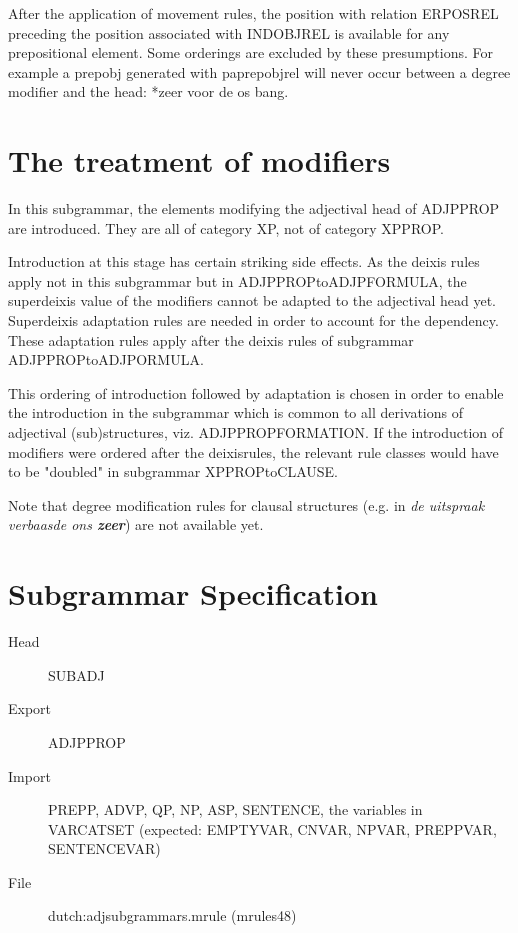 After the application of movement rules, the position with relation ERPOSREL 
preceding the position associated with INDOBJREL is 
available for any prepositional element.
Some orderings are excluded by these presumptions. For example a prepobj
generated with  paprepobjrel will never occur between a degree modifier and the 
head: *zeer voor de os bang. 
\section{The treatment of modifiers}
In this subgrammar, the elements modifying the adjectival head
of ADJPPROP are introduced. They are all of category XP, not of category XPPROP. 

Introduction at this stage has certain striking side effects. 
As the deixis rules apply not in this subgrammar but in 
ADJPPROPtoADJPFORMULA, the superdeixis value of 
the modifiers cannot be adapted to the adjectival 
head yet. Superdeixis adaptation rules are needed 
in order to account for the dependency. 
These adaptation rules apply after the deixis rules 
of subgrammar ADJPPROPtoADJPORMULA.

This ordering of introduction followed by adaptation is chosen 
in order to enable the introduction in the subgrammar which 
is common to 
all derivations of adjectival (sub)structures, viz. ADJPPROPFORMATION.
If the introduction of modifiers were ordered after the deixisrules,
the relevant rule classes would have to be "doubled" in subgrammar
XPPROPtoCLAUSE.

Note that degree modification rules for clausal structures (e.g. in {\em de 
uitspraak verbaasde ons {\bf zeer}}) are not available yet.

\section{Subgrammar Specification}

\begin{description}
  \item[Head] SUBADJ
  \item[Export] ADJPPROP
  \item[Import] PREPP, 
ADVP,  QP, NP, ASP, SENTENCE, the variables in VARCATSET
(expected: EMPTYVAR, CNVAR, NPVAR, PREPPVAR, SENTENCEVAR)
  \item[File] dutch:adjsubgrammars.mrule (mrules48)
\end{description}

